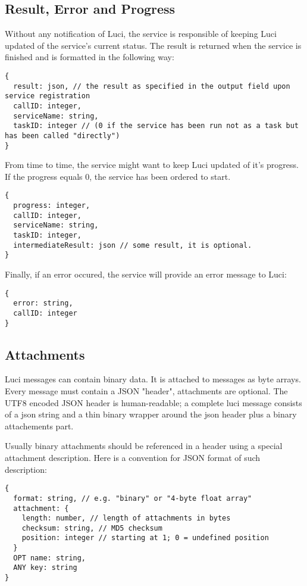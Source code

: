 \subsection{Result, Error and Progress}
Without any notification of Luci, the service is responsible of keeping Luci updated of the service's current status. The result is returned when the service is finished and is formatted in the following way:

\begin{lstlisting}
{
  result: json, // the result as specified in the output field upon service registration
  callID: integer,
  serviceName: string,
  taskID: integer // (0 if the service has been run not as a task but has been called "directly")
}
\end{lstlisting}

From time to time, the service might want to keep Luci updated of it's progress. If the progress equals 0, the service has been ordered to start.
\begin{lstlisting}
{
  progress: integer,
  callID: integer,
  serviceName: string,
  taskID: integer,
  intermediateResult: json // some result, it is optional.
}
\end{lstlisting}

Finally, if an error occured, the service will provide an error message to Luci:
\begin{lstlisting}
{
  error: string,
  callID: integer
}
\end{lstlisting}

\subsection{Attachments}

Luci messages can contain binary data. It is attached to messages as byte arrays. Every message must contain a JSON "header", attachments are optional. The UTF8 encoded JSON header is human-readable; a complete luci message consists of a json string and a thin binary wrapper around the json header plus a binary attachements part.

Usually binary attachments should be referenced in a header using a special attachment description. Here is a convention for JSON format of such description:

\begin{lstlisting}
{
  format: string, // e.g. "binary" or "4-byte float array"
  attachment: {
    length: number, // length of attachments in bytes
    checksum: string, // MD5 checksum
    position: integer // starting at 1; 0 = undefined position
  }
  OPT name: string,
  ANY key: string
}
\end{lstlisting}

